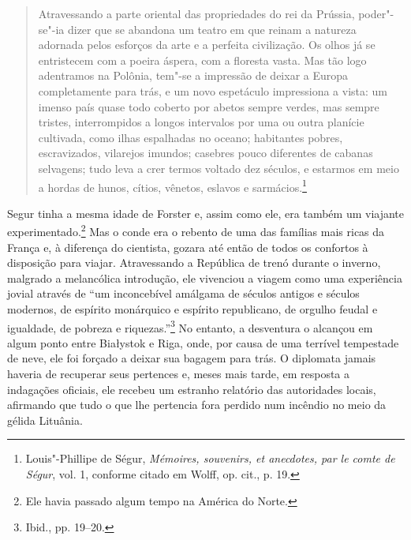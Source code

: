 \begin{quote}
Atravessando a parte oriental das propriedades do rei da Prússia,
poder"-se"-ia dizer que se abandona um teatro em que reinam a natureza
adornada pelos esforços da arte e a perfeita civilização. Os olhos já se
entristecem com a poeira áspera, com a floresta vasta. Mas tão logo
adentramos na Polônia, tem"-se a impressão de deixar a Europa
completamente para trás, e um novo espetáculo impressiona a vista: um
imenso país quase todo coberto por abetos sempre verdes, mas sempre
tristes, interrompidos a longos intervalos por uma ou outra planície
cultivada, como ilhas espalhadas no oceano; habitantes pobres,
escravizados, vilarejos imundos; casebres pouco diferentes de cabanas
selvagens; tudo leva a crer termos voltado dez séculos, e estarmos em
meio a hordas de hunos, cítios, vênetos, eslavos e sarmácios.\footnote{Louis"-Phillipe de Ségur, \textit{Mémoires, souvenirs, et anecdotes, par le comte de Ségur}, vol. 1, conforme citado em Wolff, op. cit., p. 19.} \end{quote}

Segur tinha a mesma idade de Forster e, assim como ele, era também um
viajante experimentado.\footnote{Ele havia passado algum tempo na América do Norte.} 
Mas o conde era o rebento de uma das famílias mais ricas da França e, à
diferença do cientista, gozara até então de todos os confortos à
disposição para viajar. Atravessando a República de trenó durante o
inverno, malgrado a melancólica introdução, ele vivenciou a viagem como
uma experiência jovial através de ``um inconcebível amálgama de séculos
antigos e séculos modernos, de espírito monárquico e espírito
republicano, de orgulho feudal e igualdade, de pobreza e
riquezas.''\footnote{Ibid., pp. 19--20.} No entanto, a desventura o
alcançou em algum ponto entre Białystok e Riga, onde, por causa de uma
terrível tempestade de neve, ele foi forçado a deixar sua bagagem para
trás. O diplomata jamais haveria de recuperar seus pertences e, meses
mais tarde, em resposta a indagações oficiais, ele recebeu um estranho
relatório das autoridades locais, afirmando que tudo o que lhe pertencia
fora perdido num incêndio no meio da gélida Lituânia.

